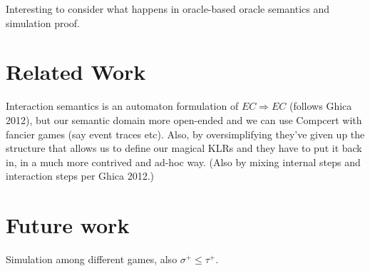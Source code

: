\documentclass[acmsmall,anonymous]{acmart}
\begin{document}
Interesting to consider what happens in
oracle-based oracle semantics and simulation proof.


\newpage
\section{Related Work} %

Interaction semantics is an automaton formulation of $EC \Rightarrow EC$
(follows Ghica 2012),
but our semantic domain more open-ended and
we can use Compcert with fancier games
(say event traces etc).
Also,
by oversimplifying they've given up the structure
that allows us to define our magical KLRs
and they have to put it back in,
in a much more contrived and ad-hoc way.
(Also by mixing internal steps and interaction steps per Ghica 2012.)


\newpage
\section{Future work} %

Simulation among different games,
also $\sigma^+ \le \tau^+$.



\end{document}
